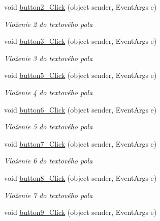 \begin{DoxyCompactItemize}
void \mbox{\hyperlink{class_i_v_s_1_1_calculator_aa6a17fb7e856187dfd9b8964e67e2f57}{button2\+\_\+\+Click}} (object sender, Event\+Args e)
\begin{DoxyCompactList}\small\item\em Vloženie \textquotesingle{}2\textquotesingle{} do textového pola \end{DoxyCompactList}\item 
void \mbox{\hyperlink{class_i_v_s_1_1_calculator_a4478858fe2f745473de5b68a7a57b2f3}{button3\+\_\+\+Click}} (object sender, Event\+Args e)
\begin{DoxyCompactList}\small\item\em Vloženie \textquotesingle{}3\textquotesingle{} do textového pola \end{DoxyCompactList}\item 
void \mbox{\hyperlink{class_i_v_s_1_1_calculator_a7ea090e719a196447aadfd4a065a42f0}{button5\+\_\+\+Click}} (object sender, Event\+Args e)
\begin{DoxyCompactList}\small\item\em Vloženie \textquotesingle{}4\textquotesingle{} do textového pola \end{DoxyCompactList}\item 
void \mbox{\hyperlink{class_i_v_s_1_1_calculator_a061c919ebdc08c877ae00f4ce1697739}{button6\+\_\+\+Click}} (object sender, Event\+Args e)
\begin{DoxyCompactList}\small\item\em Vloženie \textquotesingle{}5\textquotesingle{} do textového pola \end{DoxyCompactList}\item 
void \mbox{\hyperlink{class_i_v_s_1_1_calculator_ab96b96bb1f464fa88084118d38bc9d9e}{button7\+\_\+\+Click}} (object sender, Event\+Args e)
\begin{DoxyCompactList}\small\item\em Vloženie \textquotesingle{}6\textquotesingle{} do textového pola \end{DoxyCompactList}\item 
void \mbox{\hyperlink{class_i_v_s_1_1_calculator_a7de16fbeb3e7bea132d8540dde1cd110}{button8\+\_\+\+Click}} (object sender, Event\+Args e)
\begin{DoxyCompactList}\small\item\em Vloženie \textquotesingle{}7\textquotesingle{} do textového pola \end{DoxyCompactList}\item 
void \mbox{\hyperlink{class_i_v_s_1_1_calculator_ad6751dcda5da874d2c4c933020f5bc70}{button9\+\_\+\+Click}} (object sender, Event\+Args e)

\end{DoxyCompactItemize}
